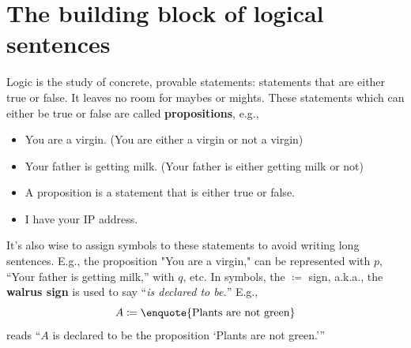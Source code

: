 \section{The building block of logical sentences}

Logic is the study of concrete, provable statements: statements that are either true or false. It leaves no room for maybes or mights. These statements which can either be true or false are called \textbf{propositions}, e.g.,
\begin{itemize}[noitemsep]
  \item You are a virgin. (You are either a virgin or not a virgin)
  \item Your father is getting milk. (Your father is either getting milk or not)
  \item A proposition is a statement that is either true or false.
  \item I have your IP address.
\end{itemize}
It's also wise to assign symbols to these statements to avoid writing long sentences. E.g., the proposition "You are a virgin," can be represented with $p$, \enquote{Your father is getting milk,} with $q$, etc. In symbols, the \(\coloneqq\) sign, a.k.a., the \textbf{walrus sign} is used to say \enquote{\emph{is declared to be.}} E.g.,
\begin{equation}
  A \coloneqq \textrm{\enquote{Plants are not green}}
\end{equation}
reads \enquote{\(A\) is declared to be the proposition \enquote{Plants are not green.}}

